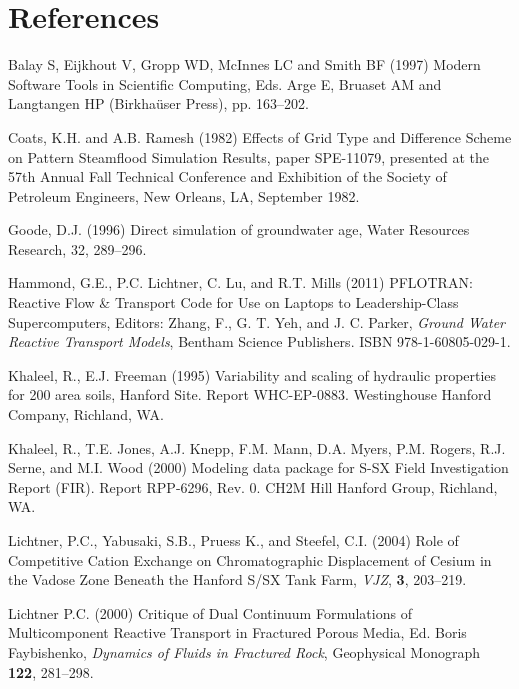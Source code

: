 \section{References}

\begin{description}

\item Balay S, Eijkhout V, Gropp WD, McInnes LC and Smith BF (1997) Modern Software Tools in Scientific Computing, Eds. Arge E, Bruaset AM and Langtangen HP (Birkha\"user Press), pp. 163--202.

\item Coats, K.H. and A.B. Ramesh (1982) Effects of Grid Type and Difference Scheme on Pattern Steamflood Simulation Results, paper SPE-11079, presented at the 57th Annual Fall Technical Conference and Exhibition of the Society of Petroleum Engineers, New Orleans, LA, September 1982.

\item Goode, D.J. (1996) Direct simulation of groundwater age, Water Resources Research, 32, 289--296.

\item Hammond, G.E., P.C. Lichtner, C. Lu, and R.T. Mills (2011) PFLOTRAN: Reactive Flow \& Transport Code for Use on Laptops to Leadership-Class Supercomputers, Editors: Zhang, F., G. T. Yeh, and J. C. Parker, {\em Ground Water Reactive Transport Models}, Bentham Science Publishers. ISBN 978-1-60805-029-1. 

\item Khaleel, R., E.J. Freeman (1995) Variability and scaling of hydraulic properties for 200 area soils, Hanford Site. Report WHC-EP-0883. Westinghouse Hanford Company, Richland, WA.

\item Khaleel, R., T.E. Jones, A.J. Knepp, F.M. Mann, D.A. Myers, P.M. Rogers, R.J. Serne, and M.I. Wood (2000) Modeling data package for S-SX Field Investigation Report (FIR). Report RPP-6296, Rev. 0. CH2M Hill Hanford Group, Richland, WA.

\item Lichtner, P.C., Yabusaki, S.B., Pruess K., and Steefel, C.I. (2004) Role of Competitive Cation Exchange on Chromatographic Displacement of Cesium in the Vadose Zone Beneath the Hanford S/SX Tank Farm, {\em VJZ}, {\bf 3}, 203--219.

\item Lichtner P.C. (2000)  Critique of Dual Continuum Formulations of Multicomponent Reactive Transport in Fractured Porous Media, Ed. Boris Faybishenko, {\em Dynamics of Fluids in Fractured Rock}, Geophysical Monograph {\bf 122}, 281--298.


\end{description}
